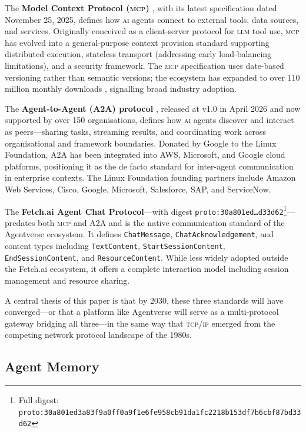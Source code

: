\documentclass[twoside,11pt]{article}
\begin{document}
The \textbf{Model Context Protocol (\textsc{mcp})}
\citep{mcp2025spec,mcp2026roadmap}, with its latest specification dated
November 25, 2025, defines how \textsc{ai} agents connect to external tools,
data sources, and services.  Originally conceived as a client-server protocol
for \textsc{llm} tool use, \textsc{mcp} has evolved into a general-purpose
context provision standard supporting distributed execution, stateless
transport (addressing early load-balancing limitations), and a security
framework.  The \textsc{mcp} specification uses date-based versioning rather
than semantic versions; the ecosystem has expanded to over 110 million monthly
downloads \citep{mcp2026roadmap}, signalling broad industry adoption.

The \textbf{Agent-to-Agent (A2A) protocol} \citep{a2a2026}, released at v1.0
in April 2026 and now supported by over 150 organisations, defines how
\textsc{ai} agents discover and interact as peers---sharing tasks, streaming
results, and coordinating work across organisational and framework boundaries.
Donated by Google to the Linux Foundation, A2A has been integrated into AWS,
Microsoft, and Google cloud platforms, positioning it as the de facto standard
for inter-agent communication in enterprise contexts.  The Linux Foundation
founding partners include Amazon Web Services, Cisco, Google, Microsoft,
Salesforce, SAP, and ServiceNow.

The \textbf{Fetch.ai Agent Chat Protocol}---with digest
\texttt{proto:30a801ed\ldots{}d33d62}\footnote{Full digest: \texttt{proto:30a801ed3a83f9a0ff0a9f1e6fe958cb91da1fc2218b153df7b6cbf87bd33d62}}---predates
both \textsc{mcp} and A2A and is the native communication standard of the
Agentverse ecosystem.  It defines \texttt{ChatMessage},
\texttt{ChatAcknowledgement}, and content types including
\texttt{TextContent}, \texttt{StartSessionContent},
\texttt{EndSessionContent}, and \texttt{ResourceContent}.  While less widely
adopted outside the Fetch.ai ecosystem, it offers a complete interaction model
including session management and resource sharing.

A central thesis of this paper is that by 2030, these three standards will have
converged---or that a platform like Agentverse will serve as a multi-protocol
gateway bridging all three---in the same way that \textsc{tcp/ip} emerged from
the competing network protocol landscape of the 1980s.

\subsection{Agent Memory}
\label{subsec:memory-background}
\end{document}
